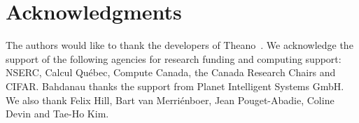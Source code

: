 \section*{Acknowledgments}

The authors would like to thank the developers of
Theano~\citep{bergstra+al:2010-scipy,Bastien-Theano-2012}.  We  acknowledge the
support of the following agencies for research funding and computing support:
NSERC, Calcul Qu\'{e}bec, Compute Canada, the Canada Research Chairs and CIFAR.
Bahdanau thanks the support from Planet Intelligent Systems GmbH.  We also thank
Felix Hill, Bart van Merri\'enboer, Jean Pouget-Abadie, Coline Devin and
Tae-Ho Kim. 

